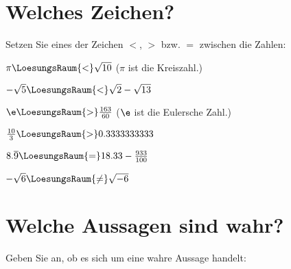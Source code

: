 
\renewcommand{\bbwAufgabenBlockID}{A1ordn}


\usepackage{amssymb} %
\renewcommand{\metaHeaderLine}{Ordnungsrelationen}
\renewcommand{\arbeitsblattTitel}{Algebra: Ordnungsrelationen}

\arbeitsblattHeader{}


\section{Welches Zeichen?}
Setzen Sie eines der Zeichen $<$, $>$ bzw. $=$ zwischen die Zahlen:

\begin{bbwAufgabenBlock}
\item $\pi \LoesungsRaum{<} \sqrt{10}$ ($\pi$ ist die Kreiszahl.)

\item $-\sqrt{5} \LoesungsRaum{<} \sqrt{2}-\sqrt{13}$

\item $\e \LoesungsRaum{>} \frac{163}{60}$ ($\e$ ist die Eulersche Zahl.)

\item $\frac{10}3 \LoesungsRaum{>} 0.3333333333$


\item $8.\overline{9} \LoesungsRaum{=} 18.33 - \frac{933}{100}$

\item $-\sqrt{6} \LoesungsRaum{\ne} \sqrt{-6}$ 

\end{bbwAufgabenBlock}

\platzFuerBerechnungenBisEndeSeite{}


\section{Welche Aussagen sind wahr?}
Geben Sie an, ob es sich um eine wahre Aussage handelt:

